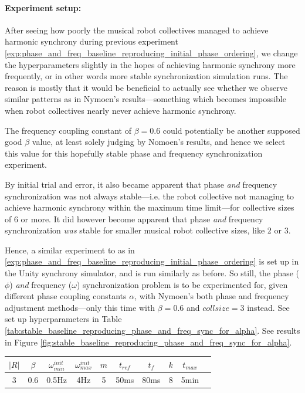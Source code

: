 			\paragraph{Experiment setup:\nl}
			
			After seeing how poorly the musical robot collectives managed to achieve harmonic synchrony during previous experiment \ref{exp:phase_and_freq_baseline_reproducing_initial_phase_ordering}, we change the hyperparameters slightly in the hopes of achieving harmonic synchrony more frequently, or in other words more stable synchronization simulation runs. The reason is mostly that it would be beneficial to actually see whether we observe similar patterns as in Nymoen's results—something which becomes impossible when robot collectives nearly never achieve harmonic synchrony.
			
			The frequency coupling constant of $\beta=0.6$ could potentially be another supposed good $\beta$ value, at least solely judging by Nomoen's results, and hence we select this value for this hopefully stable phase and frequency synchronization experiment.
			
			By initial trial and error, it also became apparent that phase \textit{and} frequency synchronization was not always stable—i.e. the robot collective not managing to achieve harmonic synchrony within the maximum time limit—for collective sizes of 6 or more. It did however become apparent that phase \textit{and} frequency synchronization \textit{was} stable for smaller musical robot collective sizes, like 2 or 3.
			
			Hence, a similar experiment to as in \ref{exp:phase_and_freq_baseline_reproducing_initial_phase_ordering} is set up in the Unity synchrony simulator, and is run similarly as before. So still, the phase ($\phi$) \textit{and} frequency ($\omega$) synchronization problem is to be experimented for, given different phase coupling constants $\alpha$, with Nymoen's both phase and frequency adjustment methods—only this time with $\beta=0.6$ and $collsize=3$ instead. See set up hyperparameters in Table \ref{tab:stable_baseline_reproducing_phase_and_freq_sync_for_alpha}. See results in Figure \ref{fig:stable_baseline_reproducing_phase_and_freq_sync_for_alpha}.
			
			\begin{center}
			\begin{tabular}{ |c|c|c|c|c|c|c|c|c|c| } 
			\hline
			$|R|$ & $\beta$ & $\omega_{min}^{init}$ & $\omega_{max}^{init}$ & $m$ & $t_{ref}$ & $t_f$ & $k$ & $t_{max}$ \\
			\hline
			3 & 0.6 & 0.5Hz & 4Hz & 5 & 50ms & 80ms & 8 & 5min \\
			\hline
			\end{tabular}
			\label{tab:stable_baseline_reproducing_phase_and_freq_sync_for_alpha}
			\end{center}
			
